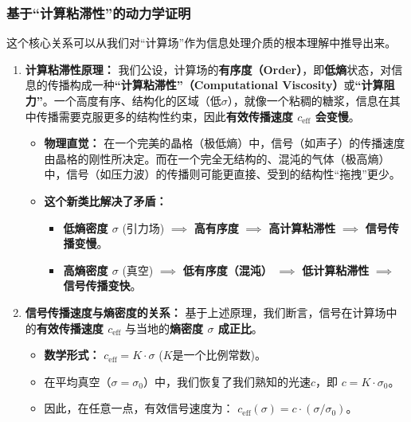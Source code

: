 \documentclass[11pt, a4paper]{article}
\begin{document}
\subsubsection*{基于“计算粘滞性”的动力学证明}

这个核心关系可以从我们对“计算场”作为信息处理介质的根本理解中推导出来。

\begin{enumerate}
    \item \textbf{计算粘滞性原理：} 我们公设，计算场的\textbf{有序度（Order）}，即\textbf{低熵}状态，对信息的传播构成一种\textbf{“计算粘滞性”（Computational Viscosity）}或\textbf{“计算阻力”}。一个高度有序、结构化的区域（低$\sigma$），就像一个粘稠的糖浆，信息在其中传播需要克服更多的结构性约束，因此\textbf{有效传播速度 $c_{\text{eff}}$ 会变慢}。
    \begin{itemize}
        \item \textbf{物理直觉：} 在一个完美的晶格（极低熵）中，信号（如声子）的传播速度由晶格的刚性所决定。而在一个完全无结构的、混沌的气体（极高熵）中，信号（如压力波）的传播则可能更直接、受到的结构性“拖拽”更少。
        \item \textbf{这个新类比解决了矛盾：}
        \begin{itemize}
            \item \textbf{低熵密度 $\sigma$} (引力场) $\implies$ \textbf{高有序度} $\implies$ \textbf{高计算粘滞性} $\implies$ \textbf{信号传播变慢}。
            \item \textbf{高熵密度 $\sigma$} (真空) $\implies$ \textbf{低有序度（混沌）} $\implies$ \textbf{低计算粘滞性} $\implies$ \textbf{信号传播变快}。
        \end{itemize}
    \end{itemize}

    \item \textbf{信号传播速度与熵密度的关系：} 基于上述原理，我们断言，信号在计算场中的\textbf{有效传播速度 $c_{\text{eff}}$} 与当地的\textbf{熵密度 $\sigma$ 成正比}。
    \begin{itemize}
        \item \textbf{数学形式：} $c_{\text{eff}} = K \cdot \sigma$ ($K$是一个比例常数)。
        \item 在平均真空（$\sigma=\sigma_0$）中，我们恢复了我们熟知的光速$c$，即 $c = K \cdot \sigma_0$。
        \item 因此，在任意一点，有效信号速度为： \textbf{$c_{\text{eff}}(\sigma) = c \cdot (\sigma / \sigma_0)$}。
    \end{itemize}


\end{enumerate}
\end{document}
